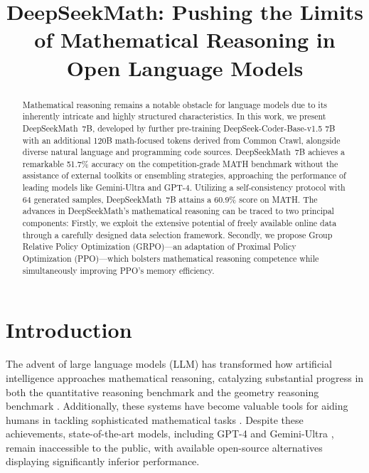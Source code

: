 \title{DeepSeekMath: Pushing the Limits of Mathematical Reasoning in Open Language Models}

\begin{abstract}
Mathematical reasoning remains a notable obstacle for language models due to its inherently intricate and highly structured characteristics. In this work, we present DeepSeekMath~7B, developed by further pre-training DeepSeek-Coder-Base-v1.5 7B with an additional 120B math-focused tokens derived from Common Crawl, alongside diverse natural language and programming code sources. DeepSeekMath~7B achieves a remarkable 51.7\% accuracy on the competition-grade MATH benchmark without the assistance of external toolkits or ensembling strategies, approaching the performance of leading models like Gemini-Ultra and GPT-4. Utilizing a self-consistency protocol with 64 generated samples, DeepSeekMath~7B attains a 60.9\% score on MATH. The advances in DeepSeekMath's mathematical reasoning can be traced to two principal components: Firstly, we exploit the extensive potential of freely available online data through a carefully designed data selection framework. Secondly, we propose Group Relative Policy Optimization (GRPO)—an adaptation of Proximal Policy Optimization (PPO)—which bolsters mathematical reasoning competence while simultaneously improving PPO's memory efficiency.
\end{abstract}

\section{Introduction}

The advent of large language models (LLM) has transformed how artificial intelligence approaches mathematical reasoning, catalyzing substantial progress in both the quantitative reasoning benchmark \citep{MATH} and the geometry reasoning benchmark \citep{trinh2024solving}. Additionally, these systems have become valuable tools for aiding humans in tackling sophisticated mathematical tasks \citep{tao}. Despite these achievements, state-of-the-art models, including GPT-4 \citep{gpt4} and Gemini-Ultra \citep{gemini}, remain inaccessible to the public, with available open-source alternatives displaying significantly inferior performance.

